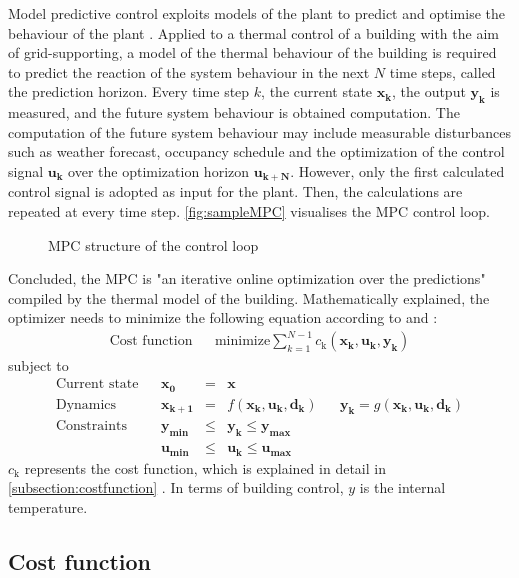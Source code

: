 Model predictive control exploits models of the plant to predict and optimise the behaviour of the plant \cite{Grune.2017}.
Applied to a thermal control of a building with the aim of grid-supporting, a model of the thermal behaviour of the building is required to predict the reaction of the system behaviour in the next $N$ time steps, called the prediction horizon. Every time step $k$, the current state $\mathbf{x_k}$, the output $\mathbf{y_k}$ is measured, and the future system behaviour is obtained computation. The computation of the future system behaviour may include measurable disturbances such as weather forecast, occupancy schedule and the optimization of the control signal $\mathbf{u_k}$ over the optimization horizon $\mathbf{u_{k+N}}$. However, only the first calculated control signal is adopted as input for the plant.
Then, the calculations are repeated at every time step. \autoref{fig:sampleMPC} visualises the MPC control loop.
 \begin{figure}[h]
    \centering
   \def\svgwidth{320pt}
    
    \caption{MPC structure of the control loop}
    \label{fig:sampleMPC}
    \end{figure}
\newline
Concluded, the MPC is "an iterative online optimization over the predictions"
\cite{Grune.2017} 
compiled by the thermal model of the building. Mathematically explained, the optimizer needs to minimize the following equation according to
\cite{Kouvaritakis.2018}
and
\cite{Oldewurtel.2012}:
\begin{align}
\label{eq:costfunc}
\textrm{Cost function} && \text{minimize} \sum_{k=1}^{N-1} c_\text{k}(\mathbf{x_k,u_k,y_k})
\end{align}
subject to 
\begin{align*}
\textrm{Current state} && \mathbf{x_0} &=& \mathbf{x} \\	
\textrm{Dynamics} && \mathbf{x_{k+1}}&=& f(\mathbf{x_k,u_k,d_k})		&&	\mathbf{y_k} = g(\mathbf{x_k,u_k,d_k})\\				
\textrm{Constraints} && \mathbf{y_{min}}&\leq& \mathbf{y_k} \leq \mathbf{y_{max}}\\		
\textrm{} && \mathbf{u_{min}}&\leq& \mathbf{u_k} \leq \mathbf{u_{max}}	
\end{align*}
$c_\text{k}$ represents the cost function, which is explained in detail in \autoref{subsection:costfunction}
. In terms of building control, $y$ is the internal temperature.

\subsection{Cost function}
\label{subsection:costfunction}

